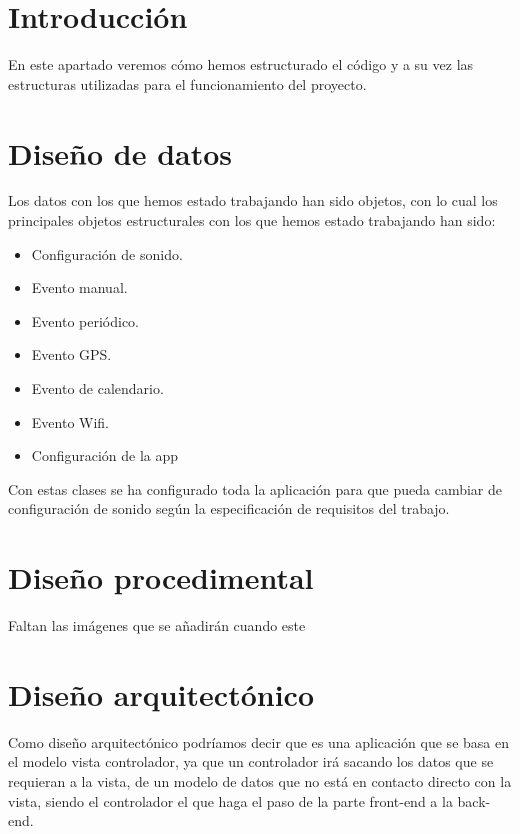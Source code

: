 
\section{Introducción}
En este apartado veremos cómo hemos estructurado el código y a su vez las estructuras utilizadas para el funcionamiento del proyecto.
\section{Diseño de datos}
Los datos con los que hemos estado trabajando han sido objetos, con lo cual los principales objetos estructurales con los que hemos estado trabajando han sido:
\begin{itemize}
	\item Configuración de sonido.
	\item Evento manual.
	\item Evento periódico.
	\item Evento GPS.
	\item Evento de calendario.
	\item Evento Wifi.
	\item Configuración de la app
\end{itemize}

Con estas clases se ha configurado toda la aplicación para que pueda cambiar de configuración de sonido según la especificación de requisitos del trabajo.



\section{Diseño procedimental}

Faltan las imágenes que se añadirán cuando este

\section{Diseño arquitectónico}

Como diseño arquitectónico podríamos decir que es una aplicación que se basa en el modelo vista controlador, ya que un controlador irá sacando los datos que se requieran a la vista, de un modelo de datos que no está en contacto directo con la vista, siendo el controlador el que haga el paso de la parte front-end a la back-end.


